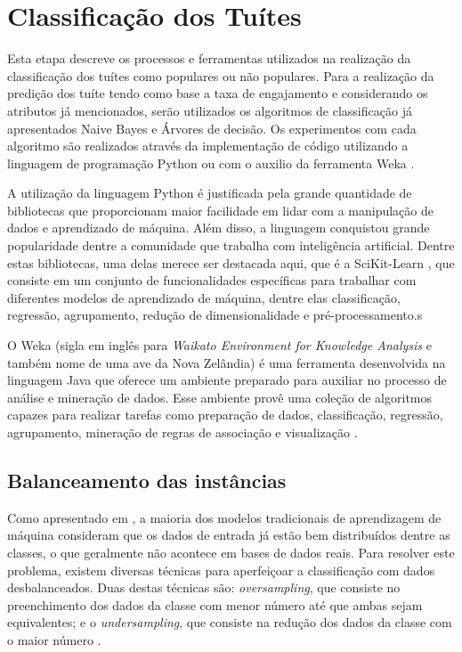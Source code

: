 \documentclass[oneside,openright,12pt]{ufsm_2015} %
\begin{document}
\section{Classificação dos Tuítes}
\label{sec:prop-classificacao}

    \par Esta etapa descreve os processos e ferramentas utilizados na realização da classificação dos tuítes como populares ou não populares. Para a realização da predição dos tuíte tendo como base a taxa de engajamento e considerando os atributos já mencionados, serão utilizados os algoritmos de classificação já apresentados Naive Bayes e Árvores de decisão. Os experimentos com cada algoritmo são realizados através da implementação de código utilizando a linguagem de programação Python \cite{site:python} ou com o auxilio da ferramenta Weka \cite{site:weka}.
    
    \par A utilização da linguagem Python é justificada pela grande quantidade de bibliotecas que proporcionam maior facilidade em lidar com a manipulação de dados e aprendizado de máquina. Além disso, a linguagem conquistou grande popularidade dentre a comunidade que trabalha com inteligência artificial. Dentre estas bibliotecas, uma delas merece ser destacada aqui, que é a SciKit-Learn \cite{site:scikit-learn}, que consiste em um conjunto de funcionalidades específicas para trabalhar com diferentes modelos de aprendizado de máquina, dentre elas classificação, regressão, agrupamento, redução de dimensionalidade e pré-processamento.s
    
    \par O Weka (sigla em inglês para \textit{Waikato Environment for Knowledge Analysis} e também nome de uma ave da Nova Zelândia) é uma ferramenta desenvolvida na linguagem Java que oferece um ambiente preparado para auxiliar no processo de análise e mineração de dados. Esse ambiente provê uma coleção de algoritmos capazes para realizar tarefas como preparação de dados, classificação, regressão, agrupamento, mineração de regras de associação e visualização \cite{site:weka}.


\subsection{Balanceamento das instâncias}
\label{sec:prop-class-balanceamento}
    
    \par Como apresentado em \cite{book:han:11}, a maioria dos modelos tradicionais de aprendizagem de máquina consideram que os dados de entrada já estão bem distribuídos dentre as classes, o que geralmente não acontece em bases de dados reais. Para resolver este problema, existem diversas técnicas para aperfeiçoar a classificação com dados desbalanceados. Duas destas técnicas são: \textit{oversampling}, que consiste no preenchimento dos dados da classe com menor número até que ambas sejam equivalentes; e o \textit{undersampling}, que consiste na redução dos dados da classe com o maior número \cite{kotsiantis:2006}.
    
\end{document}
